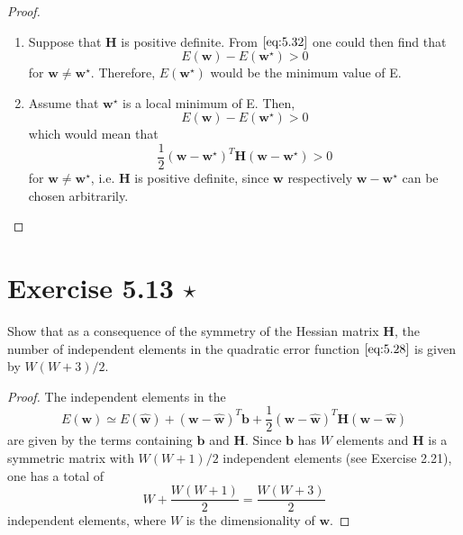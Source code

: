 \vspace{1em}

\begin{proof}
    $ $
    \begin{enumerate}
        \item [\to] Suppose that $\mathbf{H}$ is positive definite. From
            $\eqref{eq:5.32}$ one could then find that
             \[
                 E(\mathbf{w}) - E(\mathbf{w}^\star) > 0
            \] 
            for $\mathbf{w} \neq  \mathbf{w}^\star$. Therefore, $E(\mathbf{w}^\star)$
            would be the minimum value of E.
        \vspace{1em}
        \item [\leftarrow] Assume that $\mathbf{w}^\star$
            is a local minimum of E. Then,
            \[
                E(\mathbf{w}) -E(\mathbf{w}^\star) > 0
            \]
            which would mean that 
            \[
                \frac{1}{2} (\mathbf{w} - \mathbf{w}^\star)^T \mathbf{H}
                (\mathbf{w} - \mathbf{w}^\star) > 0
            \] 
            for $\mathbf{w} \neq \mathbf{w}^\star$, i.e.
            $\mathbf{H}$ is positive definite, since
            $\mathbf{w}$ respectively $\mathbf{w} - \mathbf{w}^\star$
            can be chosen arbitrarily.
    \end{enumerate}
\end{proof}

\section*{Exercise 5.13 $\star$}
Show that as a consequence of the symmetry of the Hessian matrix $\mathbf{H}$,
the number of independent elements in the quadratic error function $\eqref{eq:5.28}$ 
is given by $W(W + 3)/2$.

\vspace{1em}

\begin{proof}
    The independent elements in the
    \begin{equation}\label{eq:5.28}\tag{5.28}
        E(\mathbf{w}) \simeq E(\mathbf{\widehat{w}}) + 
        (\mathbf{w} - \widehat{\mathbf{w}})^T\mathbf{b}
        + \frac{1}{2}(\mathbf{w} - \mathbf{\widehat{w}})^T \mathbf{H} (\mathbf{w} - \mathbf{\widehat{w}})
    \end{equation}
    are given by the terms containing $\mathbf{b}$ and $\mathbf{H}$.
    Since $\mathbf{b}$ has $W$ elements and $\mathbf{H}$ is a symmetric matrix
    with $W(W + 1) / 2$ independent elements (see Exercise 2.21), one has a total of
    $$W + \frac{W(W + 1)}{2} = \frac{W(W + 3)}{2}$$ independent elements,
    where $W$ is the dimensionality of $\mathbf{w}$.
\end{proof}

